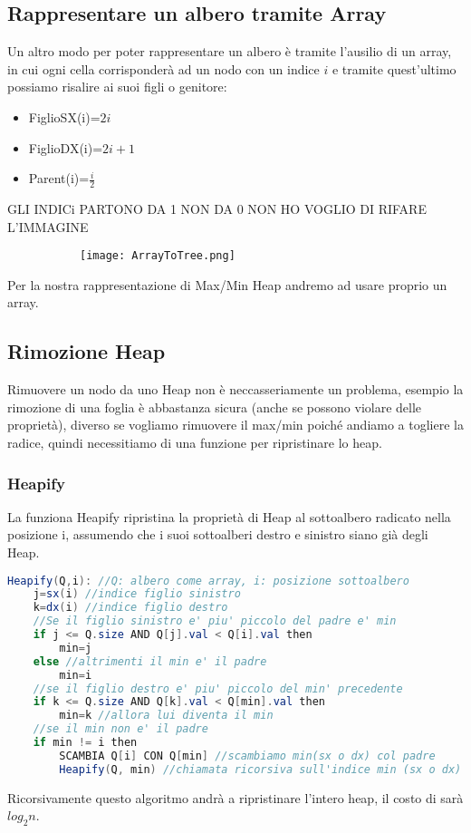 \subsection{Rappresentare un albero tramite Array}
Un altro modo per poter rappresentare un albero è tramite l'ausilio di un array, in cui ogni cella corrisponderà ad un nodo con un indice $i$ e tramite quest'ultimo possiamo risalire ai suoi figli o genitore:\medskip

\begin{itemize}
    \item FiglioSX(i)=$2i$\smallskip
 
    \item FiglioDX(i)=$2i+1$\smallskip

    \item Parent(i)=$\frac{i}{2}$\smallskip

\end{itemize}
GLI INDICi PARTONO DA 1 NON DA 0 NON HO VOGLIO DI RIFARE L'IMMAGINE
\begin{figure}[H]
	\centering
	\begin{subfigure}[b]{0.40\textwidth}
		\texttt{[image: ArrayToTree.png]} 
	\end{subfigure}
\end{figure} 
Per la nostra rappresentazione di Max/Min Heap andremo ad usare proprio un array.

\subsection{Rimozione Heap}
Rimuovere un nodo da uno Heap non è neccasseriamente un problema, esempio la rimozione di una foglia è abbastanza sicura (anche se possono violare delle proprietà), diverso se vogliamo rimuovere il max/min poiché andiamo a togliere la radice, quindi necessitiamo di una funzione per ripristinare lo heap.

\subsubsection{Heapify}
La funziona Heapify ripristina la proprietà di Heap al sottoalbero radicato nella posizione i, assumendo che i suoi sottoalberi destro e sinistro siano già degli Heap.
\begin{lstlisting}[language=Java]
Heapify(Q,i): //Q: albero come array, i: posizione sottoalbero
    j=sx(i) //indice figlio sinistro
    k=dx(i) //indice figlio destro 
    //Se il figlio sinistro e' piu' piccolo del padre e' min
    if j <= Q.size AND Q[j].val < Q[i].val then
        min=j 
    else //altrimenti il min e' il padre
        min=i 
    //se il figlio destro e' piu' piccolo del min' precedente 
    if k <= Q.size AND Q[k].val < Q[min].val then
        min=k //allora lui diventa il min
    //se il min non e' il padre
    if min != i then 
        SCAMBIA Q[i] CON Q[min] //scambiamo min(sx o dx) col padre
        Heapify(Q, min) //chiamata ricorsiva sull'indice min (sx o dx)
\end{lstlisting}
Ricorsivamente questo algoritmo andrà a ripristinare l'intero heap, il costo di sarà $log_2 n$.

